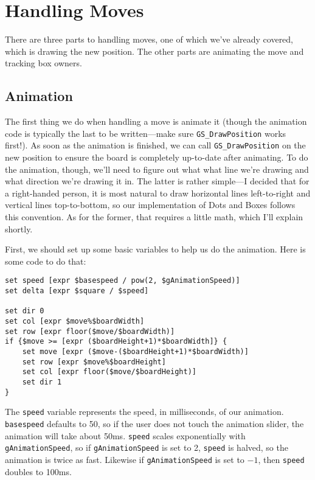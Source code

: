 \documentclass{article}
\begin{document}
\section{Handling Moves}

There are three parts to handling moves, one of which we've already covered, which is drawing the new position. The other parts are animating the move and tracking box owners.

\subsection{Animation}

The first thing we do when handling a move is animate it (though the animation code is typically the last to be written---make sure \texttt{GS\_DrawPosition} works first!). As soon as the animation is finished, we can call \texttt{GS\_DrawPosition} on the new position to ensure the board is completely up-to-date after animating. To do the animation, though, we'll need to figure out what what line we're drawing and what direction we're drawing it in. The latter is rather simple---I decided that for a right-handed person, it is most natural to draw horizontal lines left-to-right and vertical lines top-to-bottom, so our implementation of Dots and Boxes follows this convention. As for the former, that requires a little math, which I'll explain shortly.

First, we should set up some basic variables to help us do the animation. Here is some code to do that:

\begin{verbatim}
set speed [expr $basespeed / pow(2, $gAnimationSpeed)]
set delta [expr $square / $speed]

set dir 0
set col [expr $move%$boardWidth]
set row [expr floor($move/$boardWidth)] 
if {$move >= [expr ($boardHeight+1)*$boardWidth]} {
    set move [expr ($move-($boardHeight+1)*$boardWidth)]
    set row [expr $move%$boardHeight]
    set col [expr floor($move/$boardHeight)]
    set dir 1
}
\end{verbatim}

The \texttt{speed} variable represents the speed, in milliseconds, of our animation. \texttt{basespeed} defaults to 50, so if the user does not touch the animation slider, the animation will take about 50ms. \texttt{speed} scales exponentially with \texttt{gAnimationSpeed}, so if \texttt{gAnimationSpeed} is set to 2, \texttt{speed} is halved, so the animation is twice as fast. Likewise if \texttt{gAnimationSpeed} is set to $-1$, then \texttt{speed} doubles to 100ms.
\end{document}
